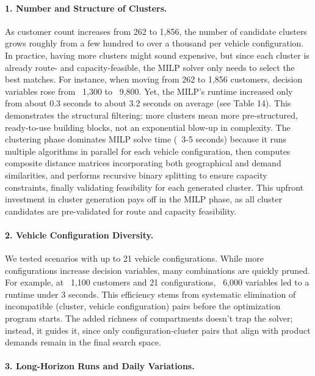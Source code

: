 \paragraph{1. Number and Structure of Clusters.}
As customer count increases from 262 to 1,856, the number of candidate clusters grows roughly from a few hundred to over a thousand per vehicle configuration. In practice, having more clusters might sound expensive, but since each cluster is already route- and capacity-feasible, the MILP solver only needs to select the best matches. For instance, when moving from 262 to 1,856 customers, decision variables rose from ~1,300 to ~9,800. Yet, the MILP’s runtime increased only from about 0.3 seconds to about 3.2 seconds on average (see Table 14). This demonstrates the structural filtering: more clusters mean more pre-structured, ready-to-use building blocks, not an exponential blow-up in complexity. The clustering phase dominates MILP solve time (~3-5 seconds) because it runs multiple algorithms in parallel for each vehicle configuration, then computes composite distance matrices incorporating both geographical and demand similarities, and performs recursive binary splitting to ensure capacity constraints, finally validating feasibility for each generated cluster.
This upfront investment in cluster generation pays off in the MILP phase, as all cluster candidates are pre-validated for route and capacity feasibility.

\paragraph{2. Vehicle Configuration Diversity.}

We tested scenarios with up to 21 vehicle configurations. While more configurations increase decision variables, many combinations are quickly pruned. For example, at ~1,100 customers and 21 configurations, ~6,000 variables led to a runtime under 3 seconds. This efficiency stems from systematic elimination of incompatible (cluster, vehicle configuration) pairs before the optimization program starts. The added richness of compartments doesn’t trap the solver; instead, it guides it, since only configuration-cluster pairs that align with product demands remain in the final search space.

\paragraph{3. Long-Horizon Runs and Daily Variations.}

